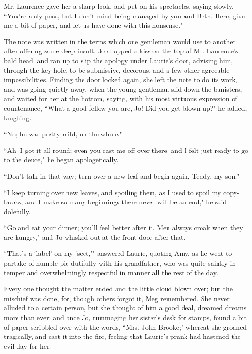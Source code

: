 Mr. Laurence gave her a sharp look, and put on his spectacles, saying
slowly, ``You're a sly puss, but I don't
mind being managed by you and Beth. Here, give me a bit of paper, and
let us have done with this nonsense."

The note was written in the terms which one gentleman would use to
another after offering some deep insult. Jo dropped a kiss on the top of
Mr. Laurence's bald head, and ran up to slip the apology
under Laurie's door, advising him, through the key-hole,
to be submissive, decorous, and a few other agreeable impossibilities.
Finding the door locked again, she left the note to do its work, and was
going quietly away, when the young gentleman slid down the banisters,
and waited for her at the bottom, saying, with his most virtuous
expression of countenance, ``What a good fellow you are, Jo! Did you get
blown up?" he added, laughing.

``No; he was pretty mild, on the whole."

``Ah! I got it all round; even you cast me off over there, and I felt
just ready to go to the deuce," he began apologetically.

``Don't talk in that way; turn over a new leaf and begin
again, Teddy, my son."

``I keep turning over new leaves, and spoiling them, as I used to spoil
my copy-books; and I make so many beginnings there never will be an
end," he said dolefully.

``Go and eat your dinner; you'll feel better after it.
Men always croak when they are hungry," and Jo whisked out at the front
door after that.

``That's a `label' on my
`sect,'" answered Laurie, quoting Amy, as
he went to partake of humble-pie dutifully with his grandfather, who was
quite saintly in temper and overwhelmingly respectful in manner all the
rest of the day.

Every one thought the matter ended and the little cloud blown over; but
the mischief was done, for, though others forgot it, Meg remembered. She
never alluded to a certain person, but she thought of him a good deal,
dreamed dreams more than ever; and once Jo, rummaging her
sister's desk for stamps, found a bit of paper scribbled
over with the words, ``Mrs. John Brooke;" whereat she groaned tragically,
and cast it into the fire, feeling that Laurie's prank
had hastened the evil day for her.
